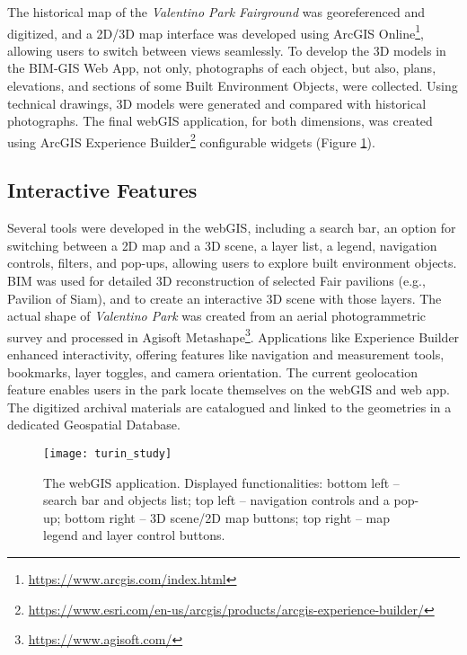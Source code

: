 The historical map of the \textit{Valentino Park Fairground} was georeferenced and digitized, and a \gls{2D}/\gls{3D} map interface was developed using ArcGIS Online\footnote{\url{https://www.arcgis.com/index.html}}, allowing users to switch between views seamlessly. 
To develop the \gls{3D} models in the \gls{BIM}-\gls{GIS} Web App, not only, photographs of each object, but also, plans, elevations, and sections of some Built Environment Objects, were collected. Using technical drawings, \gls{3D} models were generated and compared with historical photographs.
The final web\gls{GIS} application, for both dimensions, was created using ArcGIS Experience Builder\footnote{\url{https://www.esri.com/en-us/arcgis/products/arcgis-experience-builder/}} configurable widgets (Figure \ref{fig:turin_study}).

\subsection*{Interactive Features}

Several tools were developed in the web\gls{GIS}, including a search bar, an option for switching between a \gls{2D} map and a \gls{3D} scene, a layer list, a legend, navigation controls, filters, and pop-ups, allowing users to explore built environment objects. 
\gls{BIM} was used for detailed \gls{3D} reconstruction of selected Fair pavilions (e.g., Pavilion of Siam), and to create an interactive \gls{3D} scene with those layers. 
The actual shape of \textit{Valentino Park} was created from an aerial photogrammetric survey and processed in Agisoft Metashape\footnote{\url{https://www.agisoft.com/}}. Applications like Experience Builder
enhanced interactivity, offering features like navigation and measurement tools, bookmarks, layer toggles, and camera orientation. The current geolocation feature enables users in the park locate themselves on the web\gls{GIS} and web app. 
The digitized archival materials are catalogued and linked to the geometries in a dedicated Geospatial Database. 
 

\begin{figure}[h!]
  \centering
  \texttt{[image: turin\_study]}
  \caption{The web\gls{GIS} application. \small{Displayed functionalities:} \footnotesize{bottom left – search bar and objects list; top left – navigation controls and a pop-up; bottom right – 3D scene/2D map buttons; top right – map legend and layer control buttons.}}
  \label{fig:turin_study}
\end{figure}
\vspace{-10pt}
